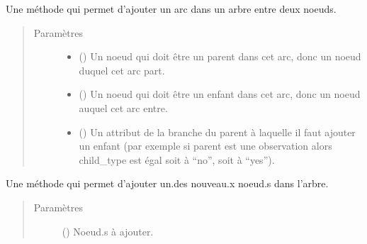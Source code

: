 \documentclass[letterpaper,10pt,french]{sphinxmanual}
\begin{document}
\begin{fulllineitems}
\begin{fulllineitems}
\label{\detokenize{index:StrategyTree.StrategyTree.add_edge}}
Une méthode qui permet d’ajouter un arc dans un arbre entre deux noeuds.
\begin{quote}\begin{description}
\item[{Paramètres}] \leavevmode\begin{itemize}
\item {} 
 () \textendash{} Un noeud qui doit être un parent dans cet arc, donc un noeud duquel cet arc part.

\item {} 
 () \textendash{} Un noeud qui doit être un enfant dans cet arc, donc un noeud auquel cet arc entre.

\item {} 
 (\sphinxstyleliteralemphasis{\sphinxupquote{, }}) \textendash{} Un attribut de la branche du parent à laquelle il faut ajouter un enfant (par exemple si parent est une
observation alors child\_type est égal soit à “no”, soit à “yes”).

\end{itemize}

\end{description}\end{quote}

\end{fulllineitems}


\begin{fulllineitems}
\label{\detokenize{index:StrategyTree.StrategyTree.add_node}}
Une méthode qui permet d’ajouter un.des nouveau.x noeud.s dans l’arbre.
\begin{quote}\begin{description}
\item[{Paramètres}] \leavevmode
{} (\sphinxstyleliteralemphasis{\sphinxupquote{)}}) \textendash{} Noeud.s à ajouter.


\end{description}
\end{quote}
\end{fulllineitems}
\end{fulllineitems}
\end{document}
